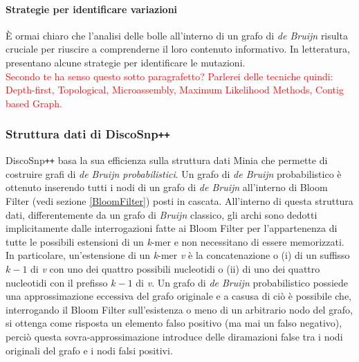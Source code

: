 \documentclass[../main.tex]{subfiles}
\begin{document}
\paragraph{Strategie per identificare variazioni} È ormai chiaro che l'analisi delle bolle all'interno di un grafo di \textit{de Bruijn} risulta cruciale per riuscire a comprenderne il loro contenuto informativo. In letteratura, \cite{leggett2014reference} presentano alcune strategie per identificare le mutazioni. \\ \textcolor{red}{Secondo te ha senso questo sotto paragrafetto? Parlerei delle tecniche quindi: Depth-first, Topological, Microassembly, Maximum Likelihood Methods, Contig based Graph.}



\subsubsection{Struttura dati di DiscoSnp\texttt{++}}

DiscoSnp\texttt{++} basa la sua efficienza sulla struttura dati Minia \cite{chikhi2013space} che permette di costruire grafi di \textit{de Bruijn probabilistici}. Un grafo di \textit{de Bruijn} probabilistico è ottenuto inserendo tutti i nodi di un grafo di \textit{de Bruijn} all'interno di Bloom Filter (vedi sezione \ref{BloomFilter}) posti in cascata. All'interno di questa struttura dati, differentemente da un grafo di \textit{Bruijn} classico, gli archi sono dedotti implicitamente dalle interrogazioni fatte ai Bloom Filter per l'appartenenza di tutte le possibili estensioni di un \textit{k}-mer e non necessitano di essere memorizzati. In particolare, un'estensione di un \textit{k}-mer \textit{v} è la concatenazione o (i) di un suffisso $k-1$ di \textit{v} con uno dei quattro possibili nucleotidi o (ii) di uno dei quattro nucleotidi con il prefisso  $k-1$ di \textit{v}. Un grafo di \textit{de Bruijn} probabilistico possiede una approssimazione eccessiva del grafo originale e a casusa di ciò è possibile che, interrogando il Bloom Filter sull'esistenza o meno di un arbitrario nodo del grafo, si ottenga come risposta un elemento falso positivo (ma mai un falso negativo), perciò questa sovra-approssimazione introduce delle diramazioni false tra i nodi originali del grafo e i nodi falsi positivi.
\end{document}
